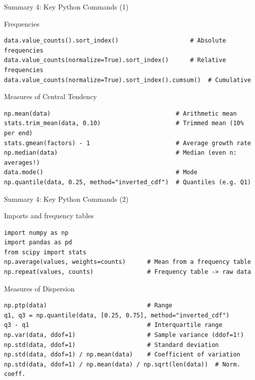 \documentclass[aspectratio=169,11pt]{beamer}
\begin{document}
\begin{frame}[fragile]{Summary 4: Key Python Commands (1)}
  \begin{block}{Frequencies}
    \begin{lstlisting}[aboveskip=0pt,belowskip=0pt]
data.value_counts().sort_index()                    # Absolute frequencies
data.value_counts(normalize=True).sort_index()      # Relative frequencies
data.value_counts(normalize=True).sort_index().cumsum()  # Cumulative
    \end{lstlisting}
  \end{block}

  \begin{block}{Measures of Central Tendency}
    \begin{lstlisting}[aboveskip=0pt,belowskip=0pt]
np.mean(data)                                   # Arithmetic mean
stats.trim_mean(data, 0.10)                     # Trimmed mean (10% per end)
stats.gmean(factors) - 1                        # Average growth rate
np.median(data)                                 # Median (even n: averages!)
data.mode()                                     # Mode
np.quantile(data, 0.25, method="inverted_cdf")  # Quantiles (e.g. Q1)
    \end{lstlisting}
  \end{block}
\end{frame}

\begin{frame}[fragile]{Summary 4: Key Python Commands (2)}
  \lstset{aboveskip=2pt,belowskip=2pt}
  \begin{block}{Imports and frequency tables}
    \begin{lstlisting}[aboveskip=0pt,belowskip=0pt]
import numpy as np
import pandas as pd
from scipy import stats
np.average(values, weights=counts)      # Mean from a frequency table
np.repeat(values, counts)               # Frequency table -> raw data
    \end{lstlisting}
  \end{block}
  \vspace{-0.3cm}
  \begin{block}{Measures of Dispersion}
    \begin{lstlisting}[aboveskip=0pt,belowskip=0pt]
np.ptp(data)                            # Range
q1, q3 = np.quantile(data, [0.25, 0.75], method="inverted_cdf")
q3 - q1                                 # Interquartile range
np.var(data, ddof=1)                    # Sample variance (ddof=1!)
np.std(data, ddof=1)                    # Standard deviation
np.std(data, ddof=1) / np.mean(data)    # Coefficient of variation
np.std(data, ddof=1) / np.mean(data) / np.sqrt(len(data))  # Norm. coeff.
    \end{lstlisting}
  \end{block}
\end{frame}
\end{document}
